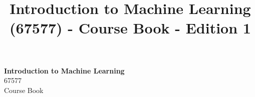 \documentclass[11pt]{book} %
\begin{document}
\title{Introduction to Machine Learning (67577) - Course Book - Edition 1}


\begingroup
\thispagestyle{empty}
\centering
\vspace*{5cm}
\par\normalfont\fontsize{35}{35}\sffamily\selectfont
\textbf{Introduction to Machine Learning}\\
{\LARGE 67577\\Course Book}\par %
\vspace*{1cm}
\endgroup

\end{document}
